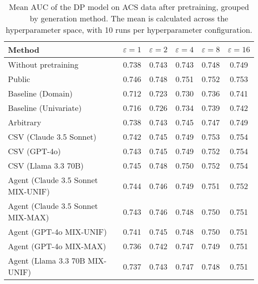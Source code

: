 \begin{table}[h!]
    \centering
    \caption{Mean AUC of the DP model on ACS data after pretraining, grouped by generation method. The mean is calculated across the hyperparameter space, with 10 runs per hyperparameter configuration.}
    \label{tab:epsilon_comparison}
    \begin{tabular}{lccccc}
    \toprule
    Method & $\varepsilon=1$ & $\varepsilon=2$ & $\varepsilon=4$ & $\varepsilon=8$ & $\varepsilon=16$ \\
    \midrule
    Without pretraining & 0.738 & 0.743 & 0.743 & 0.748 & 0.749 \\
    \arrayrulecolor{black!50!}\midrule
    Public & \cellcolor{gold!30}0.746 & \cellcolor{gold!30}0.748 & \cellcolor{gold!30}0.751 & \cellcolor{silver!30}0.752 & \cellcolor{silver!30}0.753 \\
    \arrayrulecolor{black!50!}\midrule
    Baseline (Domain) & 0.712 & 0.723 & 0.730 & 0.736 & 0.741 \\
    Baseline (Univariate) & 0.716 & 0.726 & 0.734 & 0.739 & 0.742 \\
    \arrayrulecolor{black!50!}\midrule
    Arbitrary & 0.738 & 0.743 & 0.745 & 0.747 & 0.749 \\
    \arrayrulecolor{black!50!}\midrule
    CSV (Claude 3.5 Sonnet) & 0.742 & 0.745 & \cellcolor{bronze!30}0.749 & \cellcolor{gold!30}0.753 & \cellcolor{gold!30}0.754 \\
    CSV (GPT-4o) & 0.743 & 0.745 & \cellcolor{bronze!30}0.749 & \cellcolor{silver!30}0.752 & \cellcolor{gold!30}0.754 \\
    CSV (Llama 3.3 70B) & \cellcolor{silver!30}0.745 & \cellcolor{gold!30}0.748 & \cellcolor{silver!30}0.750 & \cellcolor{silver!30}0.752 & \cellcolor{gold!30}0.754 \\
    \arrayrulecolor{black!50!}\midrule
    Agent (Claude 3.5 Sonnet MIX-UNIF) & \cellcolor{bronze!30}0.744 & \cellcolor{bronze!30}0.746 & \cellcolor{bronze!30}0.749 & \cellcolor{bronze!30}0.751 & \cellcolor{bronze!30}0.752 \\
    Agent (Claude 3.5 Sonnet MIX-MAX) & 0.743 & \cellcolor{bronze!30}0.746 & 0.748 & 0.750 & 0.751 \\
    Agent (GPT-4o MIX-UNIF) & 0.741 & 0.745 & 0.748 & 0.750 & 0.751 \\
    Agent (GPT-4o MIX-MAX) & 0.736 & 0.742 & 0.747 & 0.749 & 0.751 \\
    Agent (Llama 3.3 70B MIX-UNIF) & 0.737 & 0.743 & 0.747 & 0.748 & 0.751 \\

\end{tabular}
\end{table}
